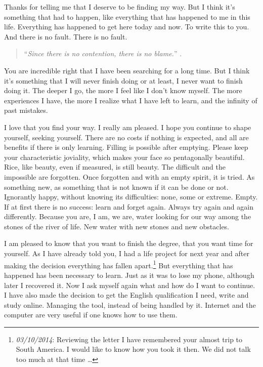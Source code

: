 \documentclass[]{book}
\let\rmarkdownfootnote\footnote%
\def\footnote{\protect\rmarkdownfootnote}
\begin{document}
Thanks for telling me that I deserve to be finding my way. But I think it's something that had to happen, like everything that has happened to me in this life. Everything has happened to get here today and now. To write this to you. And there is no fault. There is no fault.

\begin{quote}
``\emph{Since there is no contention, there is no blame.}'' \citep{ta1984tao}.
\end{quote}

You are incredible right that I have been searching for a long time. But I think it's something that I will never finish doing or at least, I never want to finish doing it. The deeper I go, the more I feel like I don't know myself. The more experiences I have, the more I realize what I have left to learn, and the infinity of past mistakes.

I love that you find your way. I really am pleased. I hope you continue to shape yourself, seeking yourself. There are no costs if nothing is expected, and all are benefits if there is only learning. Filling is possible after emptying. Please keep your characteristic joviality, which makes your face so pentagonally beautiful. Rice, like beauty, even if measured, is still beauty. The difficult and the impossible are forgotten. Once forgotten and with an empty spirit, it is tried. As something new, as something that is not known if it can be done or not. Ignorantly happy, without knowing its difficulties: none, some or extreme. Empty. If at first there is no success: learn and forget again. Always try again and again differently. Because you are, I am, we are, water looking for our way among the stones of the river of life. New water with new stones and new obstacles.

I am pleased to know that you want to finish the degree, that you want time for yourself. As I have already told you, I had a life project for next year and after making the decision everything has fallen apart.\footnote{\emph{03/10/2014}: Reviewing the letter I have remembered your almost trip to South America. I would like to know how you took it then. We did not talk too much at that time \ldots{}} But everything that has happened has been necessary to learn. Just as it was to lose my phone, although later I recovered it. Now I ask myself again what and how do I want to continue. I have also made the decision to get the English qualification I need, write and study online. Managing the tool, instead of being handled by it. Internet and the computer are very useful if one knows how to use them.
\end{document}
